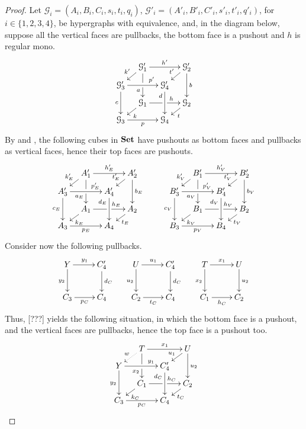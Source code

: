 \begin{proof}
	Let $\mathcal{G}_i = (A_i, B_i, C_i, s_i, t_i, q_i)$, $\mathcal{G}'_i=(A'_i, B'_i, C'_i, s'_i, t'_i, q'_i)$, for $i \in \{1, 2, 3, 4\}$, be hypergraphs with equivalence, 
	and, in the diagram below, suppose all the vertical faces are pullbacks, the bottom face is a pushout and $h$ is regular mono.
                \[
		\xymatrix@C=10pt@R=6pt{&\mathcal{G}_1'\ar[dd]|\hole_(.65){a}\ar[rr]^{h'} \ar[dl]_{k'} && \mathcal{G}_2' \ar[dd]^{b} \ar[dl]_{t'} \\ \mathcal{G}_3'  \ar[dd]_{c}\ar[rr]^(.7){p'} & & \mathcal{G}_4' \ar[dd]_(.3){d}\\&\mathcal{G}_1\ar[rr]|\hole^(.65){h} \ar[dl]^{k} && \mathcal{G}_2 \ar[dl]^{t} \\\mathcal{G}_3 \ar[rr]_{p} & & \mathcal{G}_4 }
	\]
	By  and , the following cubes in $\mathbf{Set}$ have pushouts as bottom faces and pullbacks as vertical faces, hence their top faces are pushouts.
	\[
        \xymatrix@C=10pt@R=6pt{&A_1'\ar[dd]|\hole_(.65){a_E}\ar[rr]^{h_E'} \ar[dl]_{k_E'} && A_2' \ar[dd]^{b_E} \ar[dl]_{t_E'} \\ A_3'  \ar[dd]_{c_E}\ar[rr]^(.7){p_E'} & & A_4' \ar[dd]_(.3){d_E}\\&A_1\ar[rr]|\hole^(.65){h_E} \ar[dl]^{k_E} && A_2 \ar[dl]^{t_E} \\A_3 \ar[rr]_{p_E} & & A_4 }
	\qquad
        \xymatrix@C=10pt@R=6pt{&B_1'\ar[dd]|\hole_(.65){a_V}\ar[rr]^{h_V'} \ar[dl]_{k_V'} && B_2' \ar[dd]^{b_V} \ar[dl]_{t_V'} \\ B_3'  \ar[dd]_{c_V}\ar[rr]^(.7){p_V'} & & B_4' \ar[dd]_(.3){d_V}\\&B_1\ar[rr]|\hole^(.65){h_V} \ar[dl]^{k_V} && B_2 \ar[dl]^{t_V} \\B_3 \ar[rr]_{p_V} & & B_4 }
	\]
	Consider now the following pullbacks.
	\[\xymatrix{
			Y \ar[d]_{y_2}\ar[r]^{y_1}&{C_4'}\ar[d]^{d_C}&U\ar[d]_{u_2}\ar[r]^{u_1}&{C_4'}\ar[d]^{d_C}&T\ar[r]^{x_1}\ar[d]_{x_2}&U\ar[d]^{u_2}\\
			C_3\ar[r]_{p_C}&C_4&C_2\ar[r]_{t_C}&C_4&C_1\ar[r]_{h_C}&C_2
	}\]
	Thus, [???] yields the following situation, in which the bottom face is a pushout, and the vertical faces are pullbacks, hence the top face is a pushout too.
        \[\xymatrix@C=10pt@R=6pt{&T\ar[dd]|\hole_(.65){x_2}\ar[rr]^{x_1} \ar@{.>}[dl]_{w} && U \ar[dd]^{u_2} \ar[dl]_{u_1} \\ Y  \ar[dd]_{y_2}\ar[rr]^(.7){y_1} & & C_4' \ar[dd]_(.3){d_C}\\&C_1\ar[rr]|\hole^(.65){h_C} \ar[dl]^{k_C} && C_2 \ar[dl]^{t_C} \\C_3 \ar[rr]_{p_C} & & C_4 }\]

\end{proof}
